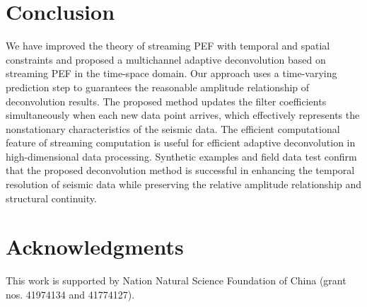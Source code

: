 \section{Conclusion}

We have improved the theory of streaming PEF with temporal and spatial
constraints and proposed a multichannel adaptive deconvolution based
on streaming PEF in the time-space domain. Our approach uses a
time-varying prediction step to guarantees the reasonable amplitude
relationship of deconvolution results. The proposed method updates the
filter coefficients simultaneously when each new data point arrives,
which effectively represents the nonstationary characteristics of the
seismic data. The efficient computational feature of streaming
computation is useful for efficient adaptive deconvolution in
high-dimensional data processing. Synthetic examples and field data
test confirm that the proposed deconvolution method is successful in
enhancing the temporal resolution of seismic data while preserving the
relative amplitude relationship and structural continuity.

\section{Acknowledgments}

This work is supported by Nation Natural Science Foundation of China
(grant nos. 41974134 and 41774127).





